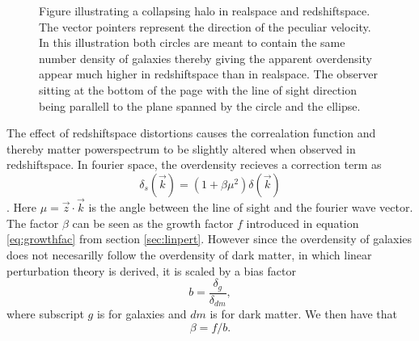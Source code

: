 \begin{figure}[htbp]\label{fig:rsddistortion}
    \caption{Figure illustrating a collapsing halo in realspace and redshiftspace. The vector pointers represent the direction of the peculiar velocity. In this illustration both circles are meant to contain the same number density of galaxies thereby giving the apparent overdensity appear much higher in redshiftspace than in realspace. The observer sitting at the bottom of the page with the line of sight direction being parallell to the plane spanned by the circle and the ellipse.}
\end{figure}
The effect of redshiftspace distortions causes the correalation function and thereby
matter powerspectrum to be slightly altered when observed in redshiftspace. In
fourier space, the overdensity recieves a correction term as
\begin{equation}
    \delta_s(\vec{k})=(1+\beta\mu^2)\delta(\vec{k})
\end{equation}
\cite[p.~279]{Dodelson:1282338}. Here $\mu=\vec{z}\cdot\vec{k}$ is the angle
between the line of sight and the fourier wave vector. The factor $\beta$ can be
seen as the growth factor $f$ introduced in equation \ref{eq:growthfac} from
section \ref{sec:linpert}. However since the overdensity of galaxies does not
necesarilly follow the overdensity of dark matter, in which linear perturbation
theory is derived, it is scaled by a bias factor
\begin{equation}\label{eq:bias}
    b=\frac{\delta_g}{\delta_{dm}},
\end{equation}
where subscript $g$ is for galaxies and $dm$ is for dark matter. We then have
that
\begin{equation}\label{eq:beta}
    \beta=f/b.
\end{equation} 
